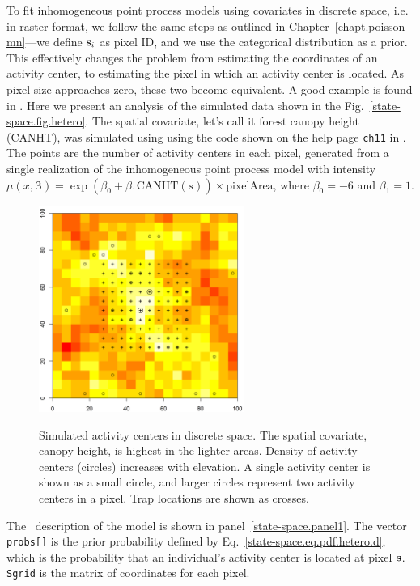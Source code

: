 To fit inhomogeneous point process models using covariates in discrete
space, i.e. in raster format, we follow the same steps
as outlined in Chapter~\ref{chapt.poisson-mn}---we define ${\bf s}_i$ as
pixel ID, and we use the categorical distribution as a prior. This
effectively changes the problem from estimating the coordinates of an
activity center, to estimating the pixel in which an activity center is
located. As pixel size approaches zero, these two become equivalent. A good
example is found in \citep{mollet_etal:2012}. Here we present
an analysis of the simulated data shown in the %
Fig.~\ref{state-space.fig.hetero}. The spatial covariate, let's call it
forest canopy height (CANHT), was simulated
using using the code shown on the help page
\verb+ch11+ in \scrbook. The points are the number of
activity centers in each pixel, generated from a single realization of
the inhomogeneous point process model with intensity
$\mu(x, \bm{\beta}) = \exp(\beta_0 + \beta_1 \text{CANHT}(s))\times\text{pixelArea}$,
where $\beta_0 = -6$ and $\beta_1 = 1$.
\begin{figure}[ht]
\centering
\includegraphics[width=0.6\textwidth]{Ch11/figs/discrete}
\label{state-space.fig.discrete}
\caption{Simulated activity centers in discrete space. The spatial
  covariate, canopy height, is highest in the lighter areas. Density of
  activity centers (circles) increases with elevation. A single
  activity center is shown as a small circle, and larger circles
  represent two activity centers in a pixel. Trap locations
  are shown as crosses.}
\end{figure}

The \bugs~description of the model is shown in
panel~\ref{state-space.panel1}. The vector \verb+probs[]+ is the prior
probability defined
by Eq.~\ref{state-space.eq.pdf.hetero.d}, which is the probability that an individual's
activity center is located at pixel $\bf s$. \verb+Sgrid+ is the
matrix of coordinates for each pixel.

